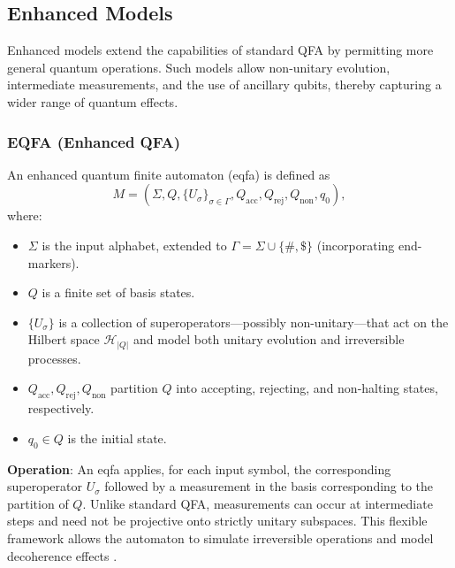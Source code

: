 \subsection{Enhanced Models}
\label{subsec:enhanced-models}

Enhanced models extend the capabilities of standard QFA by permitting more general quantum operations. Such models allow non-unitary evolution, intermediate measurements, and the use of ancillary qubits, thereby capturing a wider range of quantum effects.

\subsubsection{EQFA (Enhanced QFA)}
\label{sssec:eqfa}
\begin{definition}[EQFA]
An enhanced quantum finite automaton (\gls{eqfa}) is defined as 
\[
M = (\Sigma, Q, \{U_\sigma\}_{\sigma\in\Gamma}, Q_{\text{acc}}, Q_{\text{rej}}, Q_{\text{non}}, q_0),
\]
where:
\begin{itemize}
    \item \( \Sigma \) is the input alphabet, extended to \(\Gamma = \Sigma \cup \{ \#, \$\}\) (incorporating end-markers).
    \item \( Q \) is a finite set of basis states.
    \item \( \{U_\sigma\} \) is a collection of superoperators—possibly non-unitary—that act on the Hilbert space \(\mathcal{H}_{|Q|}\) and model both unitary evolution and irreversible processes.
    \item \( Q_{\text{acc}}, Q_{\text{rej}}, Q_{\text{non}} \) partition \( Q \) into accepting, rejecting, and non-halting states, respectively.
    \item \( q_0 \in Q \) is the initial state.
\end{itemize}
\end{definition}

\textbf{Operation}:  
An \gls{eqfa} applies, for each input symbol, the corresponding superoperator \( U_\sigma \) followed by a measurement in the basis corresponding to the partition of \( Q \). Unlike standard QFA, measurements can occur at intermediate steps and need not be projective onto strictly unitary subspaces. This flexible framework allows the automaton to simulate irreversible operations and model decoherence effects \cite{paschen2000quantum}.

